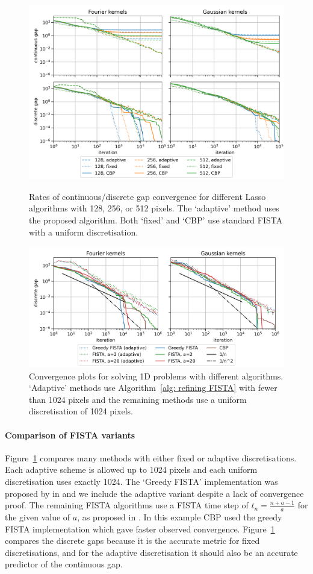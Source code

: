 \documentclass[smallextended]{svjour3}
\newcommand{\1}{\F{1}}
\newcommand{\edit}[2]{{\ifmmode\text{\color{red}\sout{\ensuremath{#1}}}\else {\color{red} \sout{#1}}\fi} {\color{darkgreen} #2}}
\begin{document}
	\begin{figure}\centering
		\includegraphics[width=.84\textwidth]{lasso_ndofs_convergence}
		\caption{Rates of continuous/discrete gap convergence for different Lasso algorithms with 128, 256, or 512 pixels. The `adaptive' method uses the proposed algorithm. Both `fixed' and `CBP' use standard FISTA with a uniform discretisation.}\label{fig: convergence with ndofs}
		
		\vspace*{\floatsep}
		
		\includegraphics[width=.84\textwidth]{lasso_convergence_short}
		\caption{\edit{Discrete }{}Convergence plots for solving 1D problems with different algorithms. `Adaptive' methods use Algorithm~\ref{alg: refining FISTA} with fewer than 1024 pixels and the remaining methods use a uniform discretisation of 1024 pixels.}\label{fig: convergence with method}
	\end{figure}
	
	
	\paragraph{Comparison of FISTA variants}
	Figure~\ref{fig: convergence with method} compares many methods with either fixed or adaptive discretisations. Each adaptive scheme is allowed up to 1024 pixels and each uniform discretisation uses exactly 1024. The `Greedy FISTA' implementation was proposed by in \cite{Liang2018} and we include the adaptive variant despite a lack of convergence proof. The remaining FISTA algorithms use a FISTA time step of $t_n = \frac{n+a-1}{a}$ for the given value of $a$, as proposed in \cite{Chambolle2015}. In this example CBP used the greedy FISTA implementation which gave faster observed convergence. Figure~\ref{fig: convergence with method} compares the discrete gaps because it is the accurate metric for fixed discretisations, and for the adaptive discretisation it should also be an accurate predictor of the continuous gap. 
	
\end{document}
